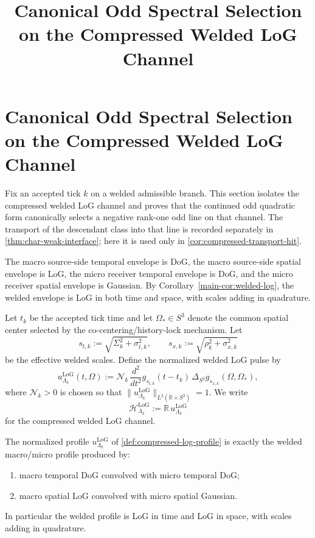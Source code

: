 \documentclass[11pt]{article}
\title{Canonical Odd Spectral Selection on the Compressed Welded LoG Channel}
\author{}
\date{}
\begin{document}
\maketitle
\fi

\section{Canonical Odd Spectral Selection on the Compressed Welded LoG Channel}
\label{sec:compressed-log-spectral-selection}

Fix an accepted tick \(k\) on a welded admissible branch. This section isolates the compressed
welded LoG channel and proves that the continued odd quadratic form canonically selects a negative
rank-one odd line on that channel. The transport of the descendant class into that line is recorded
separately in \cref{thm:char-weak-interface}; here it is used only in
\cref{cor:compressed-transport-hit}.

The macro source-side temporal envelope is DoG, the macro source-side spatial envelope is LoG, the
micro receiver temporal envelope is DoG, and the micro receiver spatial envelope is Gaussian. By
Corollary~\ref{main-cor:welded-log}, the welded envelope is LoG in both time and space, with scales
adding in quadrature.

\begin{definition}
\label{def:compressed-log-profile}
Let \(t_k\) be the accepted tick time and let \(\Omega_\ast\in S^3\) denote the common spatial center
selected by the co-centering/history-lock mechanism. Let
\[
s_{t,k}:=\sqrt{\Sigma_k^2+\sigma_{t,k}^2},
\qquad
s_{x,k}:=\sqrt{\rho_k^2+\sigma_{x,k}^2}
\]
be the effective welded scales. Define the normalized welded LoG pulse by
\begin{equation}
u^{\mathrm{LoG}}_{\Lambda_k}(t,\Omega)
:=
\mathcal N_k\,
\frac{d^2}{dt^2}g_{s_{t,k}}(t-t_k)\,
\Delta_{S^3}g_{s_{x,k}}(\Omega,\Omega_\ast),
\label{eq:ulog-def}
\end{equation}
where \(\mathcal N_k>0\) is chosen so that
\(
\|u^{\mathrm{LoG}}_{\Lambda_k}\|_{L^2(\mathbb R\times S^3)}=1
\).
We write
\begin{equation}
\mathcal H^{\mathrm{LoG}}_{\Lambda_k}
:=
\mathbb R\,u^{\mathrm{LoG}}_{\Lambda_k}
\label{eq:Hlog-def}
\end{equation}
for the compressed welded LoG channel.
\end{definition}

\begin{proposition}
\label{prop:compressed-log-exact}
The normalized profile \(u^{\mathrm{LoG}}_{\Lambda_k}\) of
\cref{def:compressed-log-profile} is exactly the welded macro/micro profile produced by:
\begin{enumerate}[leftmargin=2em]
\item macro temporal DoG convolved with micro temporal DoG;
\item macro spatial LoG convolved with micro spatial Gaussian.
\end{enumerate}
In particular the welded profile is LoG in time and LoG in space, with scales adding in quadrature.
\end{proposition}
\end{document}
